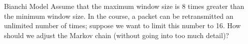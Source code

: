\begin{problem}{Bianchi Model}
Assume that the maximum window size is 8 times greater than the minimum window size. In the course, a packet can be retransmitted an unlimited number of times; suppose we want to limit this number to 16. How should we adjust the Markov chain (without going into too much detail)?
\end{problem}